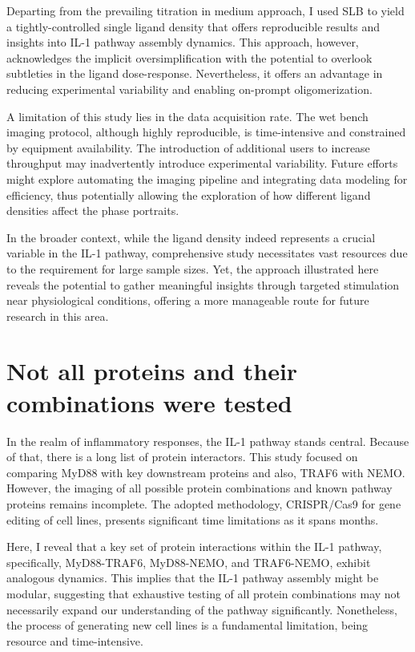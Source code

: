Departing from the prevailing titration in medium approach, I used SLB to yield a tightly-controlled single ligand density that offers reproducible results and insights into IL-1 pathway assembly dynamics. This approach, however, acknowledges the implicit oversimplification with the potential to overlook subtleties in the ligand dose-response. Nevertheless, it offers an advantage in reducing experimental variability and enabling on-prompt oligomerization.

A limitation of this study lies in the data acquisition rate. The wet bench imaging protocol, although highly reproducible, is time-intensive and constrained by equipment availability. The introduction of additional users to increase throughput may inadvertently introduce experimental variability. Future efforts might explore automating the imaging pipeline and integrating data modeling for efficiency, thus potentially allowing the exploration of how different ligand densities affect the phase portraits.

In the broader context, while the ligand density indeed represents a crucial variable in the IL-1 pathway, comprehensive study necessitates vast resources due to the requirement for large sample sizes. Yet, the approach illustrated here reveals the potential to gather meaningful insights through targeted stimulation near physiological conditions, offering a more manageable route for future research in this area.

\section{Not all proteins and their combinations were tested}
In the realm of inflammatory responses, the IL-1 pathway stands central. Because of that, there is a long list of protein interactors. This study focused on comparing MyD88 with key downstream proteins and also, TRAF6 with NEMO. However, the imaging of all possible protein combinations and known pathway proteins remains incomplete. The adopted methodology, CRISPR/Cas9 for gene editing of cell lines, presents significant time limitations as it spans months.

Here, I reveal that a key set of protein interactions within the IL-1 pathway, specifically, MyD88-TRAF6, MyD88-NEMO, and TRAF6-NEMO, exhibit analogous dynamics. This implies that the IL-1 pathway assembly might be modular, suggesting that exhaustive testing of all protein combinations may not necessarily expand our understanding of the pathway significantly. Nonetheless, the process of generating new cell lines is a fundamental limitation, being resource and time-intensive.

